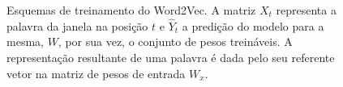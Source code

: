 \begin{figure}%
    \centering
    \qquad
    \caption{Esquemas de treinamento do Word2Vec. A matriz $X_t$ representa a
             palavra da janela na posição $t$ e $\hat{Y}_t$ a predição do modelo
             para a mesma, $W$, por sua vez, o conjunto de pesos treináveis.
             A representação resultante de uma palavra é dada pelo seu referente
             vetor na matriz de pesos de entrada $W_x$.}%
    \label{fig:w2v}%
\end{figure}

